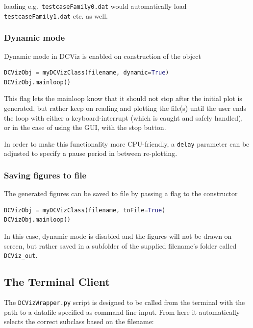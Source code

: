 loading e.g.~\verb+testcaseFamily0.dat+ would automatically load \verb+testcaseFamily1.dat+ etc. as well.


\subsubsection{Dynamic mode}

Dynamic mode in DCViz is enabled on construction of the object

\begin{lstlisting}[language=Python, otherkeywords={True}]
DCVizObj = myDCVizClass(filename, dynamic=True)
DCVizObj.mainloop()
\end{lstlisting}

This flag lets the mainloop know that it should not stop after the initial plot is generated, but rather keep on reading and plotting the file(s) until the user ends the loop with either a keyboard-interrupt (which is caught and safely handled), or in the case of using the GUI, with the stop button.

In order to make this functionality more CPU-friendly, a \verb+delay+ parameter can be adjusted to specify a pause period in between re-plotting.


\subsubsection{Saving figures to file}

The generated figures can be saved to file by passing a flag to the constructor

\begin{lstlisting}[language=Python, otherkeywords={True}]
DCVizObj = myDCVizClass(filename, toFile=True)
DCVizObj.mainloop()
\end{lstlisting}

In this case, dynamic mode is disabled and the figures will not be drawn on screen, but rather saved in a subfolder of the supplied filename's folder called \verb+DCViz_out+.

\subsection{The Terminal Client}

The \verb+DCVizWrapper.py+ script is designed to be called from the terminal with the path to a datafile specified as command line input. From here it automatically selects the correct subclass based on the filename:


